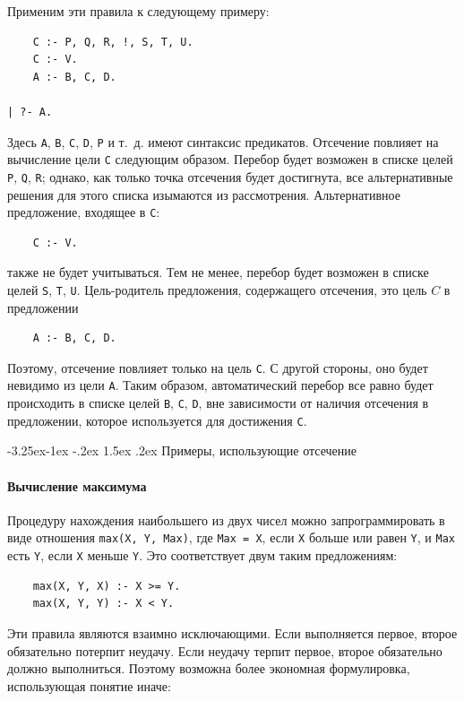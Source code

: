 \documentclass[12pt, openany, twoside]{book} %
\makeatletter
\renewcommand\subsection{\@startsection{subsection}{2}{\z@}%
                                     {-3.25ex\@plus -1ex \@minus -.2ex}%
                                     {1.5ex \@plus .2ex}%
                                     {\normalfont\normalsize\bfseries}}
\makeatother
\begin{document}
Применим эти правила к следующему примеру:
{\tt \begin{verbatim}
    С :- Р, Q, R, !, S, Т, U.
    С :- V.
    А :- В, С, D.

| ?- А.
\end{verbatim}}

Здесь {\tt А}, {\tt В}, {\tt С}, {\tt D}, {\tt P} и т.~д. имеют синтаксис предикатов. Отсечение повлияет на вычисление цели {\tt С} следующим образом. Перебор будет возможен в списке целей {\tt Р}, {\tt Q}, {\tt R}; однако, как только точка отсечения будет достигнута, все альтернативные решения для этого списка изымаются из рассмотрения. Альтернативное предложение, входящее в {\tt С}:
{\tt \begin{verbatim}
    С :- V.
\end{verbatim}}
\noindent также не будет учитываться. Тем не менее, перебор будет возможен в списке целей {\tt S}, {\tt T}, {\tt U}. Цель-родитель предложения, содержащего отсечения, это цель $C$ в предложении
{\tt \begin{verbatim}
    А :- В, С, D.
\end{verbatim}}

Поэтому, отсечение повлияет только на цель {\tt С}. С другой стороны, оно будет невидимо из цели {\tt А}. Таким образом, автоматический перебор все равно будет происходить в списке целей {\tt В}, {\tt С}, {\tt D}, вне зависимости от наличия отсечения в предложении, которое используется для достижения {\tt С}.

\subsection{Примеры, использующие отсечение}
\paragraph{Вычисление максимума}
Процедуру нахождения наибольшего из двух чисел можно запрограммировать в виде отношения {\tt max(X, Y, Мах)}, где {\tt Мах = X}, если {\tt X} больше или равен {\tt Y}, и {\tt Мах} есть {\tt Y}, если {\tt X} меньше {\tt Y}. Это соответствует двум таким предложениям:

{\tt \begin{verbatim}
    max(X, Y, X) :- X >= Y.
    max(X, Y, Y) :- X < Y.
\end{verbatim}}

Эти правила являются взаимно исключающими. Если выполняется первое, второе обязательно потерпит неудачу. Если неудачу терпит первое, второе обязательно должно выполниться. Поэтому возможна более экономная формулировка, использующая понятие иначе:
\end{document}
